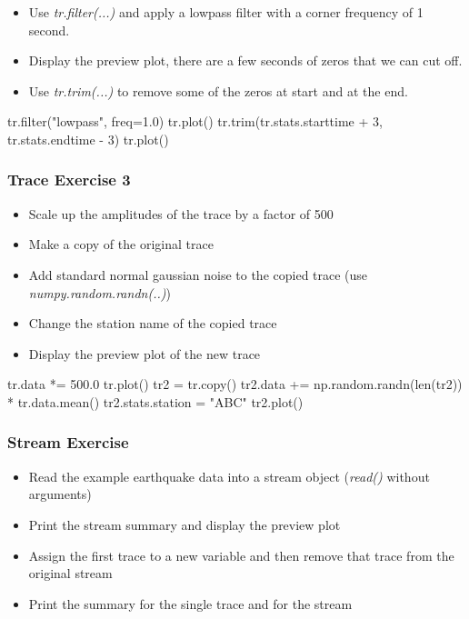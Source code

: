 \documentclass[10pt]{article}
\begin{document}
\begin{itemize}
        \item Use \textit{tr.filter(...)} and apply a lowpass filter with a corner frequency of 1 second.
        \item Display the preview plot, there are a few seconds of zeros that we can cut off.
        \item Use \textit{tr.trim(...)} to remove some of the zeros at start and at the end.
\end{itemize}

\begin{python}
tr.filter("lowpass", freq=1.0)
tr.plot()
tr.trim(tr.stats.starttime + 3, tr.stats.endtime - 3)
tr.plot()
\end{python}


\subsubsection*{Trace Exercise 3}
\begin{itemize}
        \item Scale up the amplitudes of the trace by a factor of 500
        \item Make a copy of the original trace
        \item Add standard normal gaussian noise to the copied trace (use \textit{numpy.random.randn(..)})
        \item Change the station name of the copied trace
        \item Display the preview plot of the new trace
\end{itemize}


\begin{python}
tr.data *= 500.0
tr.plot()
tr2 = tr.copy()
tr2.data += np.random.randn(len(tr2)) * tr.data.mean()
tr2.stats.station = "ABC"
tr2.plot()
\end{python}

\newpage

\subsubsection*{Stream Exercise}
    \begin{itemize}
        \item Read the example earthquake data into a stream object (\textit{read()} without arguments)
        \item Print the stream summary and display the preview plot
        \item Assign the first trace to a new variable and then remove that trace from the original stream
        \item Print the summary for the single trace and for the stream
    \end{itemize}
\end{document}
